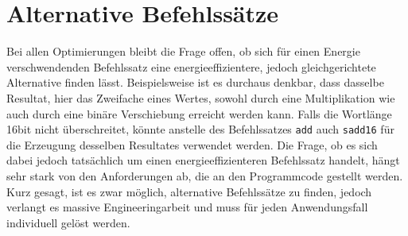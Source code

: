 \section{Alternative Befehlssätze}
\label{sec:alternative_befehlsaetze}
Bei allen Optimierungen bleibt die Frage offen, ob sich für einen Energie verschwendenden Befehlssatz eine energieeffizientere, jedoch gleichgerichtete Alternative finden lässt. Beispielsweise ist es durchaus denkbar, dass dasselbe Resultat, hier das Zweifache eines Wertes, sowohl durch eine Multiplikation wie auch durch eine binäre Verschiebung erreicht werden kann. Falls die Wortlänge 16bit nicht überschreitet, könnte anstelle des Befehlssatzes \texttt{add} auch \texttt{sadd16} für die Erzeugung desselben Resultates verwendet werden. Die Frage, ob es sich dabei jedoch tatsächlich um einen energieeffizienteren Befehlssatz handelt, hängt sehr stark von den Anforderungen ab, die an den Programmcode gestellt werden. Kurz gesagt, ist es zwar möglich, alternative Befehlssätze zu finden, jedoch verlangt es massive Engineeringarbeit und muss für jeden Anwendungsfall individuell gelöst werden.


